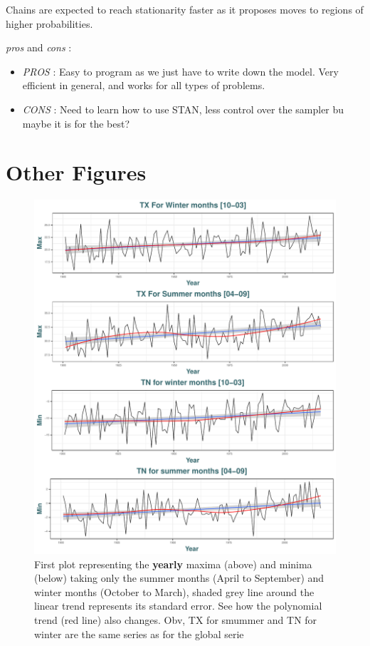 \documentclass[11pt,a4paper,openany ]{book}
\begin{document}
Chains are expected to reach stationarity faster as it proposes moves to regions of higher probabilities.


\emph{pros} and \emph{cons} : 

\begin{itemize}
	\item \emph{PROS} : Easy to program as we just have to write down the model. Very efficient in general, and works for all types of problems.
	\item \emph{CONS} : Need to learn how to use STAN, less control over the sampler bu maybe it is for the best?
\end{itemize}


\chapter{Other Figures}\label{appC}

\begin{figure}
	\includegraphics[width=\linewidth]{sumwint.pdf}\caption{First plot representing the \textbf{yearly} maxima (above) and minima (below) taking only the summer months (April to September) and winter months (October to March), shaded grey line around the linear trend represents its standard error. See how the polynomial trend (red line) also changes. Obv, TX for smummer and TN for winter are the same series as for the global serie}\label{seas4}

\end{figure}
\end{document}
